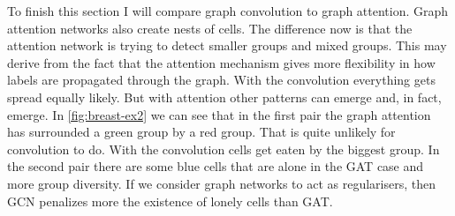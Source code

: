 To finish this section I will compare graph convolution to graph attention. Graph attention networks also create nests of cells. The difference now is that the attention network is trying to detect smaller groups and mixed groups. This may derive from the fact that the attention mechanism gives more flexibility in how labels are propagated through the graph. With the convolution everything gets spread equally likely. But with attention other patterns can emerge and, in fact, emerge. In \autoref{fig:breast-ex2} we can see that in the first pair the graph attention has surrounded a green group by a red group. That is quite unlikely for convolution to do. With the convolution cells get eaten by the biggest group. In the second pair there are some blue cells that are alone in the GAT case and more group diversity. If we consider graph networks to act as regularisers, then GCN penalizes more the existence of lonely cells than GAT.

